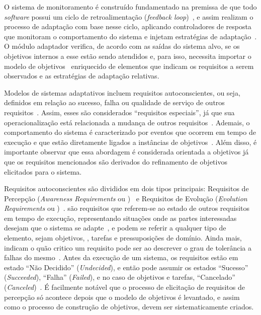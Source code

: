 O sistema de monitoramento é construído fundamentado na premissa de que todo \textit{software} possui um ciclo de retroalimentação (\textit{feedback loop})~\cite{brun2009engineering}, e assim realizam o processo de adaptação com base nesse ciclo, aplicando controladores de resposta que monitoram o comportamento do sistema e injetam estratégias de adaptação~\cite{souza2013awareness}. O módulo adaptador verifica, de acordo com as saídas do sistema alvo, se os objetivos internos a esse estão sendo atendidos e, para isso, necessita importar o modelo de objetivos~\cite{souza2013awareness} enriquecido de elementos que indicam os requisitos a serem observados e as estratégias de adaptação relativas.

Modelos de sistemas adaptativos incluem requisitos autoconscientes, ou seja, definidos em relação ao sucesso, falha ou qualidade de serviço de outros requisitos~\cite{souza2013awareness}. Assim, esses são considerados ``requisitos especiais'', já que sua operacionalização está relacionada a mudança de outros requisitos~\cite{souza2012requirement}. Ademais, o comportamento do sistema é caracterizado por eventos que ocorrem em tempo de execução e que estão diretamente ligados a instâncias de objetivos~\cite{dalpiaz2013runtime}. Além disso, é importante observar que essa abordagem é considerada orientada a objetivos já que os requisitos mencionados são derivados do refinamento de objetivos elicitados para o sistema.

Requisitos autoconscientes são divididos em dois tipos principais: Requisitos de Percepção (\textit{Awareness Requirements} ou \awreqs)~\cite{souza2013awareness} e Requisitos de Evolução (\textit{Evolution Requirements} ou \evoreqs)~\cite{souza2012requirement}. \awreqs são requisitos que referem-se ao estado de outros requisitos em tempo de execução, representando situações onde as partes interessadas desejam que o sistema se adapte~\cite{souza2012requirement}, e podem se referir a qualquer tipo de elemento, sejam objetivos, \sofgoals, tarefas e pressuposições de domínio. Ainda mais, \awreqs indicam o quão critico um requisito pode ser ao descrever o grau de tolerância a falhas do mesmo~\cite{souza2012requirement}. Antes da execução de um sistema, os requisitos estão em estado ``Não Decidido'' (\textit{Undecided}), e então pode assumir os estados ``Sucesso'' (\textit{Succeeded}), ``Falha'' (\textit{Failed}), e no caso de objetivos e tarefas, ``Cancelado'' (\textit{Canceled})~\cite{souza2013awareness}. É facilmente notável que o processo de elicitação de requisitos de percepção só acontece depois que o modelo de objetivos é levantado, e assim como o processo de construção de objetivos, \awreqs devem ser sistematicamente criados.

